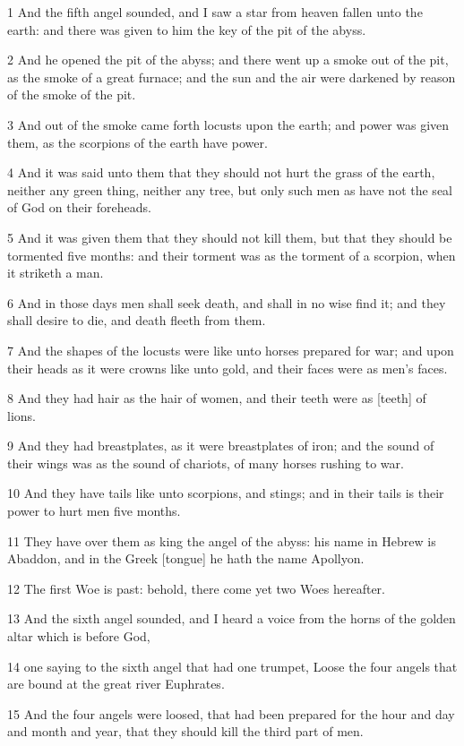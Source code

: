 \par 1 And the fifth angel sounded, and I saw a star from heaven fallen unto the earth: and there was given to him the key of the pit of the abyss.
\par 2 And he opened the pit of the abyss; and there went up a smoke out of the pit, as the smoke of a great furnace; and the sun and the air were darkened by reason of the smoke of the pit.
\par 3 And out of the smoke came forth locusts upon the earth; and power was given them, as the scorpions of the earth have power.
\par 4 And it was said unto them that they should not hurt the grass of the earth, neither any green thing, neither any tree, but only such men as have not the seal of God on their foreheads.
\par 5 And it was given them that they should not kill them, but that they should be tormented five months: and their torment was as the torment of a scorpion, when it striketh a man.
\par 6 And in those days men shall seek death, and shall in no wise find it; and they shall desire to die, and death fleeth from them.
\par 7 And the shapes of the locusts were like unto horses prepared for war; and upon their heads as it were crowns like unto gold, and their faces were as men's faces.
\par 8 And they had hair as the hair of women, and their teeth were as [teeth] of lions.
\par 9 And they had breastplates, as it were breastplates of iron; and the sound of their wings was as the sound of chariots, of many horses rushing to war.
\par 10 And they have tails like unto scorpions, and stings; and in their tails is their power to hurt men five months.
\par 11 They have over them as king the angel of the abyss: his name in Hebrew is Abaddon, and in the Greek [tongue] he hath the name Apollyon.
\par 12 The first Woe is past: behold, there come yet two Woes hereafter.
\par 13 And the sixth angel sounded, and I heard a voice from the horns of the golden altar which is before God,
\par 14 one saying to the sixth angel that had one trumpet, Loose the four angels that are bound at the great river Euphrates.
\par 15 And the four angels were loosed, that had been prepared for the hour and day and month and year, that they should kill the third part of men.
